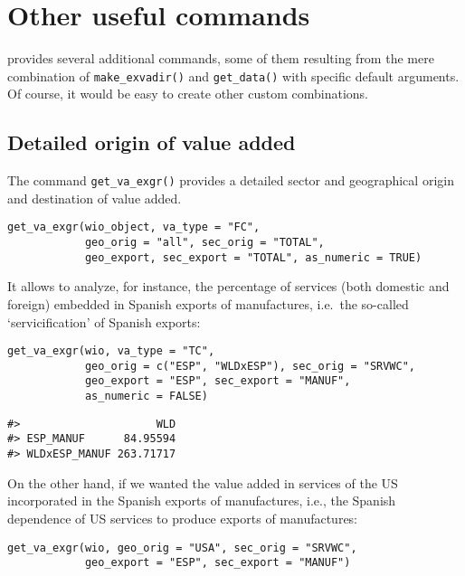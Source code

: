 \hypertarget{other-useful-commands}{%
\section{Other useful commands}\label{other-useful-commands}}

 provides several additional commands, some of them
resulting from the mere combination of \texttt{make\_exvadir()} and \texttt{get\_data()} with
specific default arguments. Of course, it would be easy to create other custom combinations.

\hypertarget{detailed-origin-of-value-added}{%
\subsection{Detailed origin of value added}\label{detailed-origin-of-value-added}}

The command \texttt{get\_va\_exgr()} provides a detailed sector and geographical origin
and destination of value added.

\begin{verbatim}
get_va_exgr(wio_object, va_type = "FC", 
            geo_orig = "all", sec_orig = "TOTAL",
            geo_export, sec_export = "TOTAL", as_numeric = TRUE)
\end{verbatim}

It allows to analyze, for instance, the percentage of services (both domestic
and foreign) embedded in Spanish exports of manufactures, i.e.~the so-called
`servicification' of Spanish exports:

\begin{verbatim}
get_va_exgr(wio, va_type = "TC", 
            geo_orig = c("ESP", "WLDxESP"), sec_orig = "SRVWC",
            geo_export = "ESP", sec_export = "MANUF", 
            as_numeric = FALSE)
\end{verbatim}

\begin{verbatim}
#>                     WLD
#> ESP_MANUF      84.95594
#> WLDxESP_MANUF 263.71717
\end{verbatim}

On the other hand, if we wanted the value added in services of the US
incorporated in the Spanish exports of manufactures, i.e., the Spanish
dependence of US services to produce exports of manufactures:

\begin{verbatim}
get_va_exgr(wio, geo_orig = "USA", sec_orig = "SRVWC",
            geo_export = "ESP", sec_export = "MANUF")
\end{verbatim}

